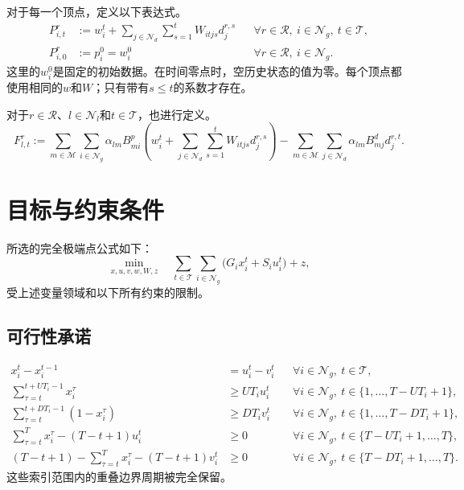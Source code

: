 \documentclass[11pt]{article}
\begin{document}
对于每一个顶点，定义以下表达式。
\begin{align}
 P_{i,t}^r&:=w_i^t+
 \sum_{j\in\mathcal N_d}\sum_{s=1}^{t}W_{itjs}d_j^{r,s}
 &&\forall r\in\mathcal R,\ i\in\mathcal N_g,\ t\in\mathcal T,\label{eq:dispatch}\\
 P_{i,0}^r&:=p_i^0=w_i^0
 &&\forall r\in\mathcal R,\ i\in\mathcal N_g.\label{eq:initial}
\end{align}
这里的$w_i^0$是固定的初始数据。在时间零点时，空历史状态的值为零。每个顶点都使用相同的$w$和$W$；只有带有$s\le t$的系数才存在。

对于$r\in\mathcal R$、$l\in\mathcal N_l$和$t\in\mathcal T$，也进行定义。
\begin{equation}
 F_{l,t}^r:=
 \sum_{m\in\mathcal M}\sum_{i\in\mathcal N_g}
 \alpha_{lm}B^p_{mi}
 \left(w_i^t+\sum_{j\in\mathcal N_d}\sum_{s=1}^{t}
 W_{itjs}d_j^{r,s}\right)
 -\sum_{m\in\mathcal M}\sum_{j\in\mathcal N_d}
 \alpha_{lm}B^d_{mj}d_j^{r,t}.
 \label{eq:flow}
\end{equation}

\section{目标与约束条件}

所选的完全极端点公式如下：
\begin{equation}
 \min_{x,u,v,w,W,z}\quad
 \sum_{t\in\mathcal T}\sum_{i\in\mathcal N_g}
 \bigl(G_ix_i^t+S_iu_i^t\bigr)+z,
 \label{eq:objective}
\end{equation}
受上述变量领域和以下所有约束的限制。

\subsection{可行性承诺}

\begin{align}
 x_i^t-x_i^{t-1}&=u_i^t-v_i^t
 &&\forall i\in\mathcal N_g,\ t\in\mathcal T,\label{eq:transition}\\
 \sum_{\tau=t}^{t+UT_i-1}x_i^\tau&\ge UT_i u_i^t
 &&\forall i\in\mathcal N_g,\ t\in\{1,\ldots,T-UT_i+1\},\label{eq:up}\\
 \sum_{\tau=t}^{t+DT_i-1}(1-x_i^\tau)&\ge DT_i v_i^t
 &&\forall i\in\mathcal N_g,\ t\in\{1,\ldots,T-DT_i+1\},\label{eq:down}\\
 \sum_{\tau=t}^{T}x_i^\tau-(T-t+1)u_i^t&\ge0
 &&\forall i\in\mathcal N_g,\ t\in\{T-UT_i+1,\ldots,T\},\label{eq:terminal-up}\\
 (T-t+1)-\sum_{\tau=t}^{T}x_i^\tau-(T-t+1)v_i^t&\ge0
 &&\forall i\in\mathcal N_g,\ t\in\{T-DT_i+1,\ldots,T\}.\label{eq:terminal-down}
\end{align}
这些索引范围内的重叠边界周期被完全保留。
\end{document}
